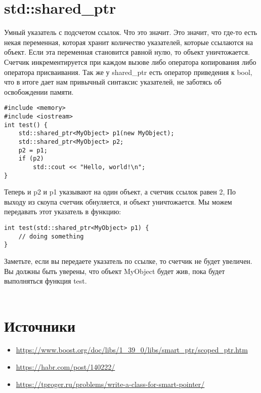 ﻿\documentclass {article}
\begin{document}
\section{std::shared\_ptr }
Умный указатель с подсчетом ссылок. Что это значит. Это значит, что где-то есть некая переменная, которая хранит количество указателей, которые ссылаются на объект. Если эта переменная становится равной нулю, то объект уничтожается. Счетчик инкрементируется при каждом вызове либо оператора копирования либо оператора присваивания. Так же у shared\_ptr есть оператор приведения к bool, что в итоге дает нам привычный синтаксис указателей, не заботясь об освобождении памяти.
\begin{lstlisting}[caption=Пример]
#include <memory> 
#include <iostream>
int test() {
    std::shared_ptr<MyObject> p1(new MyObject);
    std::shared_ptr<MyObject> p2;    
    p2 = p1;    
    if (p2)
        std::cout << "Hello, world!\n";
}
\end{lstlisting}
Теперь и p2 и p1 указывают на один объект, а счетчик ссылок равен 2, По выходу из скоупа счетчик обнуляется, и объект уничтожается. Мы можем передавать этот указатель в функцию:
\begin{lstlisting}[caption=Пример]
int test(std::shared_ptr<MyObject> p1) {
    // doing something
}
\end{lstlisting}
Заметьте, если вы передаете указатель по ссылке, то счетчик не будет увеличен. Вы должны быть уверены, что объект MyObject будет жив, пока будет выполняться функция test.\\\\
\newline
\section{Источники}
\begin{itemize}
\item \url{https://www.boost.org/doc/libs/1_39_0/libs/smart_ptr/scoped_ptr.htm}
\item \url{https://habr.com/post/140222/}
\item \url{https://tproger.ru/problems/write-a-class-for-smart-pointer/}
\end{itemize}
\newpage
\tableofcontents
\end{document}
